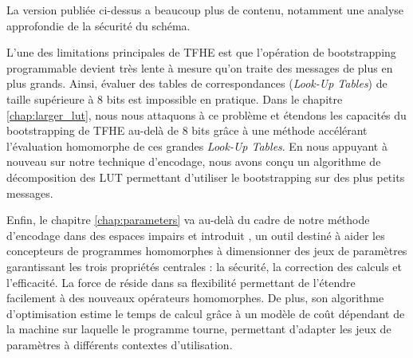 La version publiée ci-dessus a beaucoup plus de contenu, notamment une analyse approfondie de la sécurité du schéma.


L'une des limitations principales de \gls{TFHE} est que l'opération de bootstrapping programmable devient très lente à mesure qu'on traite des messages de plus en plus grands. Ainsi, évaluer des tables de correspondances (\textit{Look-Up Tables}) de taille supérieure à 8 bits est impossible en pratique.  Dans le chapitre \ref{chap:larger_lut}, nous nous attaquons à ce problème et étendons les capacités du bootstrapping de \gls{TFHE} au-delà de 8 bits grâce à une méthode accélérant l’évaluation homomorphe de ces grandes \textit{Look-Up Tables}. En nous appuyant à nouveau sur notre technique d'encodage, nous avons conçu un algorithme de décomposition des \gls{LUT} permettant d'utiliser le bootstrapping sur des plus petits messages. 



Enfin, le chapitre \ref{chap:parameters} va au-delà du cadre de notre méthode d'encodage dans des espaces impairs et introduit \toolName, un outil destiné à aider les concepteurs de programmes homomorphes à dimensionner des jeux de paramètres garantissant les trois propriétés centrales : la sécurité, la correction des calculs et l’efficacité. La force de \toolName réside dans sa flexibilité permettant de l'étendre facilement à des nouveaux opérateurs homomorphes. De plus, son algorithme d'optimisation estime le temps de calcul grâce à un modèle de coût dépendant de la machine sur laquelle le programme tourne, permettant d'adapter les jeux de paramètres à différents contextes d'utilisation.


